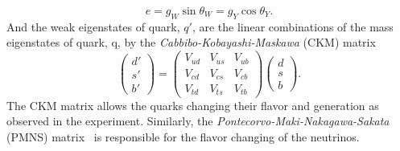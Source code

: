 %
\begin{equation}
    e = g_{W} \sin\theta_{W} = g_{Y} \cos\theta_{Y}.
    \label{eq:sm_coupling_constants}
\end{equation}
%
And the weak eigenstates of quark, $q'$, are the linear combinations of the mass eigenstates of quark, q, by the \textit{Cabbibo-Kobayashi-Maskawa} (CKM) matrix~\cite{Kobayashi:1973fv}
%
\begin{equation}
    \left(\begin{matrix}d'\\s'\\b'\end{matrix}\right) = \left(\begin{matrix}V_{ud} & V_{us} & V_{ub}\\V_{cd} & V_{cs} & V_{cb}\\V_{td} & V_{ts} &V_{tb}\end{matrix}\right) \left(\begin{matrix}d\\s\\b\end{matrix}\right).
    \label{eq:sm_CKM_matrix}
\end{equation}
%
The CKM matrix allows the quarks changing their flavor and generation as observed in the experiment.
Similarly, the \textit{Pontecorvo-Maki-Nakagawa-Sakata} (PMNS) matrix~\cite{Maki:1962mu} is responsible for the flavor changing of the neutrinos.



